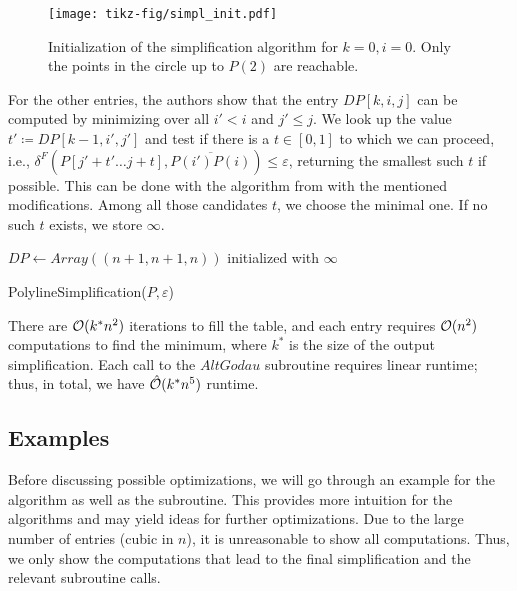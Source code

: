 \begin{figure}[b]
  \centering
  \texttt{[image: tikz-fig/simpl\_init.pdf]}
  \caption{Initialization of the simplification algorithm for \(k = 0, i = 0\). Only the points in the circle up to \(P(2)\) are reachable.}
  \label{fig:simpl_init}
\end{figure}


For the other entries, the authors show that the entry \(DP[k, i, j]\) can be computed by minimizing over all \(i' < i\) and \(j' \leq j\). We look up the value \(t' \coloneq DP[k-1, i', j']\) and test if there is a \(t \in [0, 1]\) to which we can proceed, i.e., \(\delta^F(P[j' + t' \dots j + t], \overline{P(i')P(i)}) \leq \varepsilon\), returning the smallest such \(t\) if possible. This can be done with the algorithm from \citeauthor{computing_the_frechet_distance_between_two_polygonal_curves} with the mentioned modifications. Among all those candidates \(t\), we choose the minimal one. If no such \(t\) exists, we store \(\infty\).

\begin{algorithm}[ht]
  \DontPrintSemicolon
  \BlankLine
  \(DP \gets Array((n + 1, n + 1, n))\) initialized with \(\infty\) \;
  \caption{PolylineSimplification(\(P, \varepsilon\))}
  \label{algo:simplify_simple}
\end{algorithm}

There are \(\mathcal{O}(k^* n^2)\) iterations to fill the table, and each entry requires \(\mathcal{O}(n^2)\) computations to find the minimum, where \(k^*\) is the size of the output simplification. Each call to the \(AltGodau\) subroutine requires linear runtime; thus, in total, we have \(\hat{\mathcal{O}}(k^*n^5)\) runtime.

\subsection{Examples}
Before discussing possible optimizations, we will go through an example for the algorithm as well as the \citeauthor{computing_the_frechet_distance_between_two_polygonal_curves} subroutine. This provides more intuition for the algorithms and may yield ideas for further optimizations. Due to the large number of entries (cubic in \(n\)), it is unreasonable to show all computations. Thus, we only show the computations that lead to the final simplification and the relevant subroutine calls.

